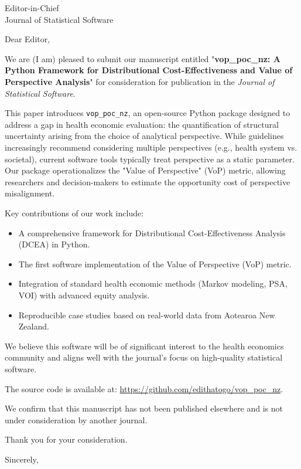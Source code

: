 \documentclass{letter}
\begin{document}
\begin{letter}{Editor-in-Chief \\ Journal of Statistical Software}

\opening{Dear Editor,}

We are (I am) pleased to submit our manuscript entitled "\textbf{vop\_poc\_nz: A Python Framework for Distributional Cost-Effectiveness and Value of Perspective Analysis}" for consideration for publication in the \textit{Journal of Statistical Software}.

This paper introduces \texttt{vop\_poc\_nz}, an open-source Python package designed to address a gap in health economic evaluation: the quantification of structural uncertainty arising from the choice of analytical perspective. While guidelines increasingly recommend considering multiple perspectives (e.g., health system vs. societal), current software tools typically treat perspective as a static parameter. Our package operationalizes the "Value of Perspective" (VoP) metric, allowing researchers and decision-makers to estimate the opportunity cost of perspective misalignment.

Key contributions of our work include:
\begin{itemize}
    \item A comprehensive framework for Distributional Cost-Effectiveness Analysis (DCEA) in Python.
    \item The first software implementation of the Value of Perspective (VoP) metric.
    \item Integration of standard health economic methods (Markov modeling, PSA, VOI) with advanced equity analysis.
    \item Reproducible case studies based on real-world data from Aotearoa New Zealand.
\end{itemize}

We believe this software will be of significant interest to the health economics community and aligns well with the journal's focus on high-quality statistical software.

The source code is available at: \url{https://github.com/edithatogo/vop_poc_nz}.

We confirm that this manuscript has not been published elsewhere and is not under consideration by another journal.

Thank you for your consideration.

\closing{Sincerely,}

\end{letter}
\end{document}
